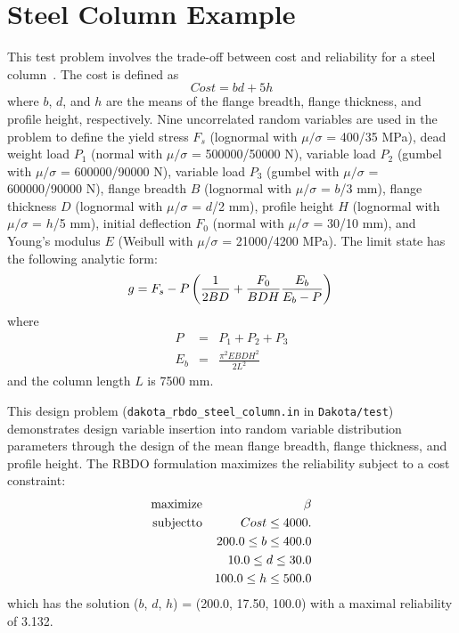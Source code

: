 \section{Steel Column Example}\label{additional:steel_column}

This test problem involves the trade-off between cost and
reliability for a steel column~\cite{Kus97}.  The cost is defined as
\begin{equation}
Cost = b d + 5 h
\end{equation}
where $b$, $d$, and $h$ are the means of the flange breadth, flange
thickness, and profile height, respectively.  Nine uncorrelated random
variables are used in the problem to define the yield stress $F_s$
(lognormal with $\mu/\sigma$ = 400/35 MPa), dead weight load $P_1$
(normal with $\mu/\sigma$ = 500000/50000 N), variable load $P_2$
(gumbel with $\mu/\sigma$ = 600000/90000 N), variable load $P_3$
(gumbel with $\mu/\sigma$ = 600000/90000 N), flange breadth $B$
(lognormal with $\mu/\sigma$ = $b$/3 mm), flange thickness $D$
(lognormal with $\mu/\sigma$ = $d$/2 mm), profile height $H$
(lognormal with $\mu/\sigma$ = $h$/5 mm), initial deflection $F_0$
(normal with $\mu/\sigma$ = 30/10 mm), and Young's modulus $E$ (Weibull
with $\mu/\sigma$ = 21000/4200 MPa).  The limit state has the
following analytic form:
\begin{equation}
g = F_s - P \left( \frac{1}{2 B D} + 
\frac{F_0}{B D H} \frac{E_b}{E_b - P} \right)\\
\end{equation}
where
\begin{eqnarray}
P   & = & P_1 + P_2 + P_3 \\
E_b & = & \frac{\pi^2 E B D H^2}{2 L^2}
\end{eqnarray}
and the column length $L$ is 7500 mm.

This design problem (\texttt{dakota\_rbdo\_steel\_column.in} in
\texttt{Dakota/test}) demonstrates design variable insertion into
random variable distribution parameters through the design of the mean
flange breadth, flange thickness, and profile height.  The RBDO
formulation maximizes the reliability subject to a cost constraint:
\begin{eqnarray}
{\rm maximize }   & & \beta                   \nonumber \\
{\rm subject to } & & Cost  \leq 4000.        \nonumber \\
                  & & 200.0 \leq b \leq 400.0 \\
                  & &  10.0 \leq d \leq  30.0 \nonumber \\
                  & & 100.0 \leq h \leq 500.0 \nonumber
\end{eqnarray}
which has the solution ($b$, $d$, $h$) = (200.0, 17.50, 100.0) with a
maximal reliability of 3.132.

